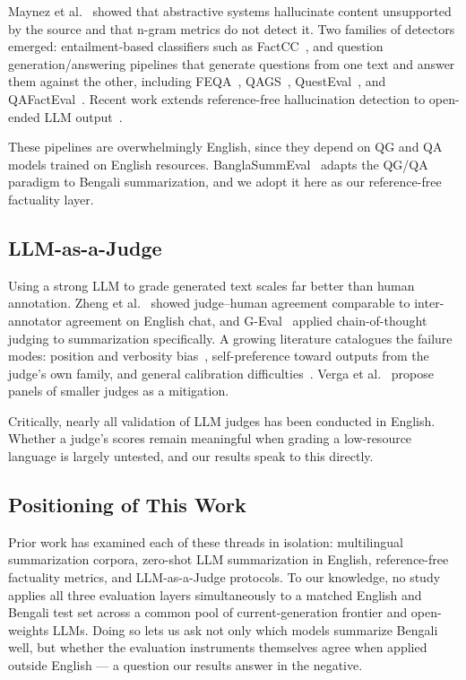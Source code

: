 \documentclass[runningheads]{llncs}
\begin{document}
Maynez et al.~\cite{maynez2020} showed that abstractive systems hallucinate
content unsupported by the source and that n-gram metrics do not detect it.
Two families of detectors emerged: entailment-based classifiers such as
FactCC~\cite{kryscinski2020}, and question generation/answering pipelines that
generate questions from one text and answer them against the other, including
FEQA~\cite{durmus2020}, QAGS~\cite{wang2020}, QuestEval~\cite{scialom2021}, and
QAFactEval~\cite{fabbri2022}. Recent work extends reference-free hallucination
detection to open-ended LLM output~\cite{urlana2025,farquhar2024}.

These pipelines are overwhelmingly English, since they depend on QG and QA
models trained on English resources. BanglaSummEval~\cite{rafid2026} adapts the
QG/QA paradigm to Bengali summarization, and we adopt it here as our
reference-free factuality layer.

\subsection{LLM-as-a-Judge}

Using a strong LLM to grade generated text scales far better than human
annotation. Zheng et al.~\cite{zheng2023} showed judge--human agreement
comparable to inter-annotator agreement on English chat, and
G-Eval~\cite{liu2023} applied chain-of-thought judging to summarization
specifically. A growing literature catalogues the failure modes: position and
verbosity bias~\cite{wang2023unfair}, self-preference toward outputs from the
judge's own family, and general calibration difficulties~\cite{gu2024}.
Verga et al.~\cite{verga2024} propose panels of smaller judges as a mitigation.

Critically, nearly all validation of LLM judges has been conducted in English.
Whether a judge's scores remain meaningful when grading a low-resource language
is largely untested, and our results speak to this directly.

\subsection{Positioning of This Work}

Prior work has examined each of these threads in isolation: multilingual
summarization corpora, zero-shot LLM summarization in English, reference-free
factuality metrics, and LLM-as-a-Judge protocols. To our knowledge, no study
applies all three evaluation layers simultaneously to a matched English and
Bengali test set across a common pool of current-generation frontier and
open-weights LLMs. Doing so lets us ask not only which models summarize Bengali
well, but whether the evaluation instruments themselves agree when applied
outside English --- a question our results answer in the negative.
\end{document}
